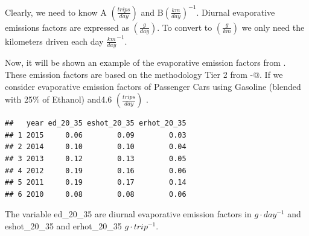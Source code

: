 \documentclass[12pt,graybox,envcountchap,sectrefs]{krantz}
\theoremstyle{definition}
\theoremstyle{definition}
\theoremstyle{definition}
\theoremstyle{remark}
\begin{document}
Clearly, we need to know A \((\frac{trips}{day})\) and
B\((\frac{km}{day})^{-1}\). Diurnal evaporative emissions factors are
expressed as \((\frac{g}{day})\). To convert to \((\frac{g}{km})\) we
only need the kilometers driven each day \(\frac{km}{day}^{-1}\).

Now, it will be shown an example of the evaporative emission factors
from \citet{CETESB2015}. These emission factors are based on the
methodology Tier 2 from -@\citet{MelliosNtziachristos2016}. If we
consider evaporative emission factors of Passenger Cars using Gasoline
(blended with 25\% of Ethanol) \citep{CETESB2015} and4.6
\((\frac{trips}{day})\) \citep{ibarrathesis}.

\begin{verbatim}
##   year ed_20_35 eshot_20_35 erhot_20_35
## 1 2015     0.06        0.09        0.03
## 2 2014     0.10        0.10        0.04
## 3 2013     0.12        0.13        0.05
## 4 2012     0.19        0.16        0.06
## 5 2011     0.19        0.17        0.14
## 6 2010     0.08        0.08        0.06
\end{verbatim}

The variable ed\_20\_35 are diurnal evaporative emission factors in
\(g \cdot day^{-1}\) and eshot\_20\_35 and erhot\_20\_35
\(g \cdot trip^{-1}\).
\end{document}
